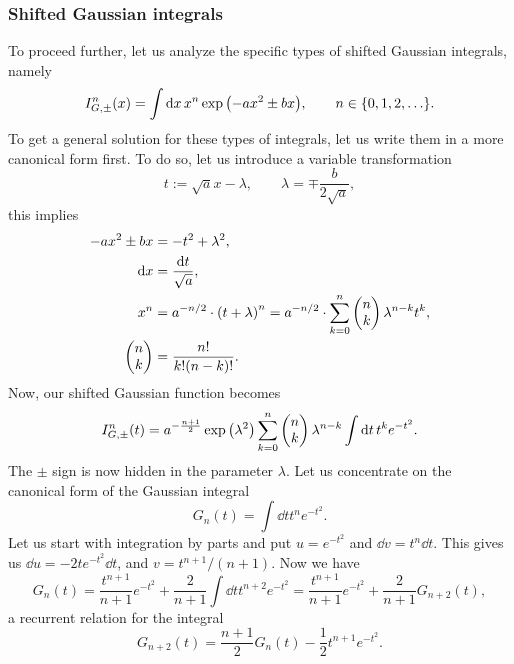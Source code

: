 \documentclass[aps,prl,preprint,groupedaddress,10pt]{revtex4-2}
\begin{document}
\subsubsection{Shifted Gaussian integrals}
To proceed further, let us analyze the specific types of shifted Gaussian integrals,
namely
\begin{equation}
    I_{G,\pm}^n(x)=\int\dd{x}x^n\exp\pqty{-ax^2\pm bx},\qquad n\in\Bqty{0,1,2,\dots}.
\end{equation}
To get a general solution for these types of integrals, let us write them in a
more canonical form first. To do so, let us introduce a variable transformation
\begin{equation}
    t:=\sqrt{a}x-\lambda,\qquad\lambda=\mp\frac{b}{2\sqrt{a}},
\end{equation}
this implies
\begin{equation}
    \begin{split}
        -ax^2\pm bx&=-t^2+\lambda^2,\\
        \dd{x}&=\frac{\dd{t}}{\sqrt{a}},\\
        x^n&=a^{-n/2}\cdot\pqty{t+\lambda}^n=a^{-n/2}\cdot
        \sum_{k=0}^{n}\pmqty{n\\k}\lambda^{n-k}t^k,\\
        \pmqty{n\\k}&=\frac{n!}{k!(n-k)!}.
    \end{split}
\end{equation}
Now, our shifted Gaussian function becomes
\begin{equation}
    I_{G,\pm}^{n}(t)=a^{-\frac{n+1}{2}}\exp\pqty{\lambda^2}\sum_{k=0}^{n}\pmqty{n\\k}
    \lambda^{n-k}\int\dd{t}t^ke^{-t^2}.
\end{equation}
The $\pm$ sign is now hidden in the parameter $\lambda$. Let us concentrate on the
canonical form of the Gaussian integral
\begin{equation}
    G_n(t)=\int\dd{t}t^ne^{-t^2}.
\end{equation}
Let us start with integration by parts and put $u=e^{-t^2}$ and $\dd{v}=t^n\dd{t}$.
This gives us $\dd{u}=-2te^{-t^2}\dd{t}$, and $v=t^{n+1}/(n+1)$. Now we have
\begin{equation}
    G_n(t)=\frac{t^{n+1}}{n+1}e^{-t^2}+\frac{2}{n+1}\int\dd{t}t^{n+2}e^{-t^2}=
    \frac{t^{n+1}}{n+1}e^{-t^2}+\frac{2}{n+1}G_{n+2}(t),
\end{equation}
a recurrent relation for the integral
\begin{equation}
    G_{n+2}(t)=\frac{n+1}{2}G_n(t)-\frac{1}{2}t^{n+1}e^{-t^2}.
\end{equation}
\end{document}
